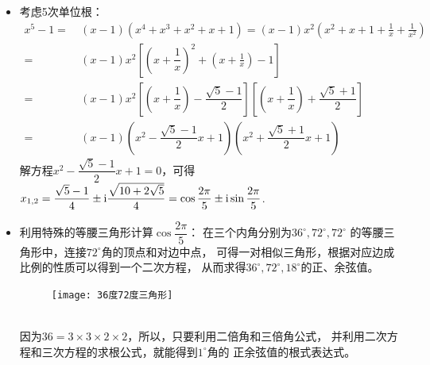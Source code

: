 \begin{itemize}[leftmargin=\inteval{\myitemleftmargin}pt,itemsep=
   \inteval{\myitemitempsep}pt,topsep=\inteval{\myitemtopsep}pt]
%

\item 考虑5次单位根：
\begin{align*}
    x^5-1=&\ (x-1)(x^4+x^3+x^2+x+1)=(x-1) x^2 \left(x^2+x+1+\frac{1}{x}+\frac{1}{x^2} \right)  \\
    =&\  (x-1) x^2 \left[\left( x+\dfrac{1}{x} \right)^2+ \left( x+\frac{1}{x} \right)-1  \right] \\
    =&\ (x-1) x^2\left[ \left(x+\dfrac{1}{x} \right)-\dfrac{\sqrt{5}-1}{2}  \right] 
    \left[ \left(x+\dfrac{1}{x} \right)+\dfrac{\sqrt{5}+1}{2} \right]   \\
    =&\  (x-1)\left( x^2-\dfrac{\sqrt{5}-1}{2}x+1\right) \left( x^2+\dfrac{\sqrt{5}+1}{2}x+1\right) 
\end{align*}
解方程$  x^2-\dfrac{\sqrt{5}-1}{2}x+1=0 $，可得$ x_{1,2}=\dfrac{\sqrt{5}-1}{4}
\pm \mathrm{i}\dfrac{\sqrt{10+2\sqrt{5}}}{4}=\cos\dfrac{2\pi}{5}\pm \mathrm{i} \sin \dfrac{2\pi}{5} $. 

\item 利用特殊的等腰三角形计算$ \cos\dfrac{2\pi}{5} $：
在三个内角分别为$ 36^{\circ},72^{\circ},72^{\circ}$
的等腰三角形中，连接$ 72^{\circ} $角的顶点和对边中点，
可得一对相似三角形，根据对应边成比例的性质可以得到一个二次方程，
从而求得$ 36^{\circ},72^{\circ},18^{\circ} $的正、余弦值。
\begin{figure}[h]
    \centering
    \texttt{[image: 36度72度三角形]}
\end{figure} \\
因为$ 36=3\times 3 \times 2\times 2 $，所以，只要利用二倍角和三倍角公式，
并利用二次方程和三次方程的求根公式，就能得到$ 1^{\circ} $角的
正余弦值的根式表达式。


\end{itemize}
